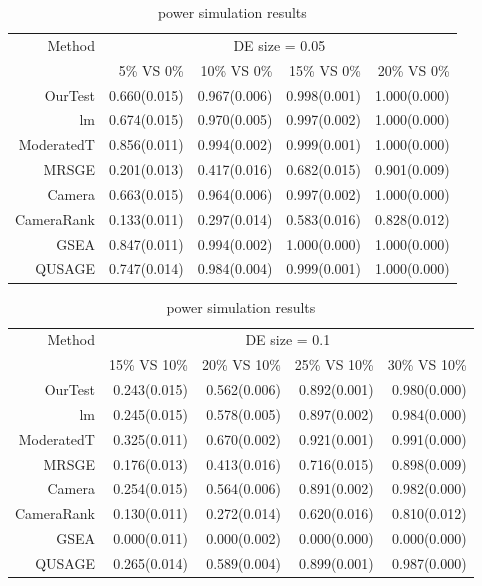 \documentclass[11pt, a4paper]{article}
\begin{document}
		  		
	\begin{table}[ht]
		\centering
			\caption{power simulation results}\label{table:power1}
		\begin{tabular}{rrrrr}
			\hline
		
		Method & \multicolumn{4}{c}{DE size = 0.05} \\
			\cline{2-5}
			& 5\% VS 0\% & 10\% VS 0\% & 15\% VS 0\% & 20\% VS 0\% \\ 
			\hline 
			OurTest & 0.660(0.015) & 0.967(0.006) & 0.998(0.001) & 1.000(0.000) \\ 
			lm & 0.674(0.015) & 0.970(0.005) & 0.997(0.002) & 1.000(0.000) \\ 
			ModeratedT & 0.856(0.011) & 0.994(0.002) & 0.999(0.001) & 1.000(0.000) \\ 
			MRSGE & 0.201(0.013) & 0.417(0.016) & 0.682(0.015) & 0.901(0.009) \\ 
			Camera & 0.663(0.015) & 0.964(0.006) & 0.997(0.002) & 1.000(0.000) \\ 
			CameraRank & 0.133(0.011) & 0.297(0.014) & 0.583(0.016) & 0.828(0.012) \\ 
			GSEA & 0.847(0.011) & 0.994(0.002) & 1.000(0.000) & 1.000(0.000) \\ 
			QUSAGE & 0.747(0.014) & 0.984(0.004) & 0.999(0.001) & 1.000(0.000) \\ 
			\hline
		\end{tabular}
	\end{table}
	
	
	\begin{table}[ht]
		\centering
	    \caption{power simulation results}\label{table:power2}
		\begin{tabular}{rrrrr}
			\hline
		Method & \multicolumn{4}{c}{DE size = 0.1} \\
			\cline{2-5}
			& 15\% VS 10\% & 20\% VS 10\% & 25\% VS 10\% & 30\% VS 10\% \\ 
			\hline
		OurTest & 0.243(0.015) & 0.562(0.006) & 0.892(0.001) & 0.980(0.000) \\ 
		lm & 0.245(0.015) & 0.578(0.005) & 0.897(0.002) & 0.984(0.000) \\ 
		ModeratedT & 0.325(0.011) & 0.670(0.002) & 0.921(0.001) & 0.991(0.000) \\ 
		MRSGE & 0.176(0.013) & 0.413(0.016) & 0.716(0.015) & 0.898(0.009) \\ 
		Camera & 0.254(0.015) & 0.564(0.006) & 0.891(0.002) & 0.982(0.000) \\ 
		CameraRank & 0.130(0.011) & 0.272(0.014) & 0.620(0.016) & 0.810(0.012) \\ 
		GSEA & 0.000(0.011) & 0.000(0.002) & 0.000(0.000) & 0.000(0.000) \\ 
		QUSAGE & 0.265(0.014) & 0.589(0.004) & 0.899(0.001) & 0.987(0.000) \\ 
		\hline
		\end{tabular}
	\end{table}
	
\end{document}
